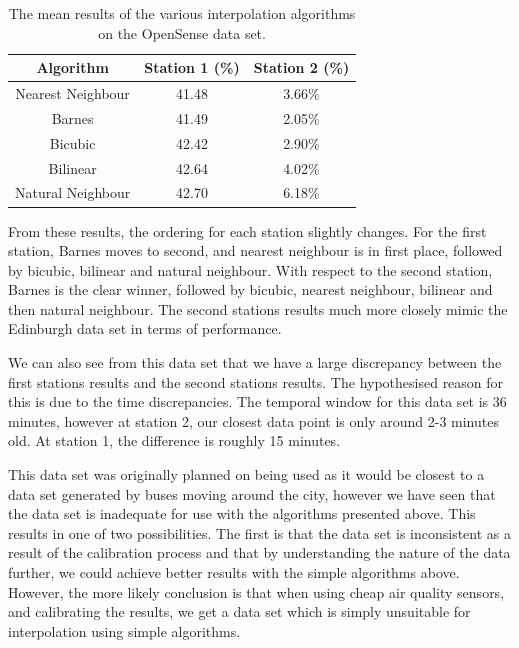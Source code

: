 			\begin{table}
				\centering
	    		\begin{tabular}{|c|c|c|}
	    			\hline
					Algorithm & Station 1 (\%) & Station 2 (\%) \\ \hline
					Nearest Neighbour & 41.48 & 3.66\% \\
					Barnes & 41.49 & 2.05\% \\
					Bicubic & 42.42 & 2.90\% \\
					Bilinear & 42.64 & 4.02\% \\
					Natural Neighbour & 42.70 & 6.18\% \\
					\hline
				\end{tabular}
				\caption{The mean results of the various interpolation algorithms on the OpenSense data set.}
				\label{tab:opensense_interpolation_split}
			\end{table} 

			From these results, the ordering for each station slightly changes. For the first station, Barnes moves to second, and nearest neighbour is in first place, followed by bicubic, bilinear and natural neighbour. With respect to the second station, Barnes is the clear winner, followed by bicubic, nearest neighbour, bilinear and then natural neighbour. The second stations results much more closely mimic the Edinburgh data set in terms of performance. 

			We can also see from this data set that we have a large discrepancy between the first stations results and the second stations results. The hypothesised reason for this is due to the time discrepancies. The temporal window for this data set is 36 minutes, however at station 2, our closest data point is only around 2-3 minutes old. At station 1, the difference is roughly 15 minutes. 

			This data set was originally planned on being used as it would be closest to a data set generated by buses moving around the city, however we have seen that the data set is inadequate for use with the algorithms presented above. This results in one of two possibilities. The first is that the data set is inconsistent as a result of the calibration process and that by understanding the nature of the data further, we could achieve better results with the simple algorithms above. However, the more likely conclusion is that when using cheap air quality sensors, and calibrating the results, we get a data set which is simply unsuitable for interpolation using simple algorithms. 

